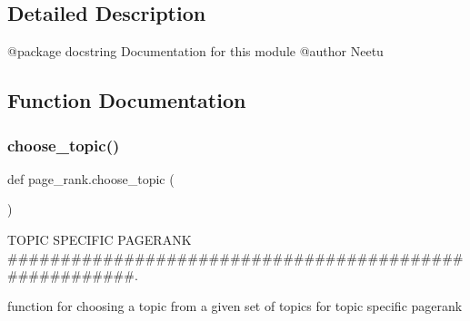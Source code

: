 \subsection{Detailed Description}
\begin{DoxyVerb}@package docstring
Documentation for this module
  @author Neetu
\end{DoxyVerb}
 

\subsection{Function Documentation}
\mbox{\label{namespacepage__rank_a77f7c229348c3413461ec9d7a4d8df48}} 
\subsubsection{\texorpdfstring{choose\+\_\+topic()}{choose\_topic()}}
{\footnotesize\ttfamily def page\+\_\+rank.\+choose\+\_\+topic (\begin{DoxyParamCaption}{ }\end{DoxyParamCaption})}



T\+O\+P\+IC S\+P\+E\+C\+I\+F\+IC P\+A\+G\+E\+R\+A\+NK \#\#\#\#\#\#\#\#\#\#\#\#\#\#\#\#\#\#\#\#\#\#\#\#\#\#\#\#\#\#\#\#\#\#\#\#\#\#\#\#\#\#\#\#\#\#\#\#\#\#\#\#\#\#\#. 

\begin{DoxyVerb}function for choosing a topic from a given set of topics for topic specific pagerank \end{DoxyVerb}
 \mbox{\label{namespacepage__rank_a0b16fcccf88cf39e3140e84693ccb629}} 
